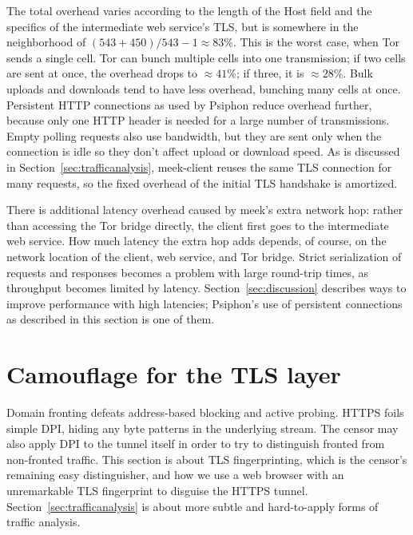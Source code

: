 \documentclass[conference]{IEEEtran}
\newcommand{\meekclient}{\mbox{meek-client}\xspace}
\begin{document}
\noindent
The total overhead varies according to the length
of the Host field and the specifics of the intermediate web service's TLS,
but is somewhere in the neighborhood of $(543+450)/543-1\approx83$\%.
This is the worst case, when Tor sends a single cell.
Tor can bunch multiple cells into one transmission;
if two cells are sent at once, the overhead drops to
${\approx}41$\%; if three, it is ${\approx}28$\%.
Bulk uploads and downloads tend to have less overhead, bunching many cells at once.
Persistent HTTP connections as used by Psiphon reduce overhead further,
because only one HTTP header is needed for a large number of transmissions.
Empty polling requests also use bandwidth,
but they are sent only when the connection is idle
so they don't affect upload or download speed.
As is discussed in Section~\ref{sec:trafficanalysis},
\meekclient reuses the same TLS connection for many requests,
so the fixed overhead of the initial TLS handshake is amortized.


There is additional latency overhead caused by meek's extra network hop:
rather than accessing the Tor bridge directly,
the client first goes to the intermediate web service.
How much latency the extra hop adds depends, of course, on the network location
of the client, web service, and Tor bridge.
Strict serialization of requests and responses
becomes a problem with large round-trip times,
as throughput becomes limited by latency.
Section~\ref{sec:discussion} describes ways to improve
performance with high latencies;
Psiphon's use of persistent connections as described in this section is one of them.

\section{Camouflage for the TLS layer}
\label{sec:browserextension}

Domain fronting defeats address-based blocking and active probing.
HTTPS foils simple DPI,
hiding any byte patterns in the underlying stream.
The censor may also apply DPI to the tunnel itself in order to try to
distinguish fronted from non-fronted traffic.
This section is about TLS fingerprinting,
which is the censor's remaining easy distinguisher,
and how we use a web browser with an unremarkable TLS fingerprint
to disguise the HTTPS tunnel.
Section~\ref{sec:trafficanalysis} is about more subtle and hard-to-apply forms of traffic analysis.
\end{document}
